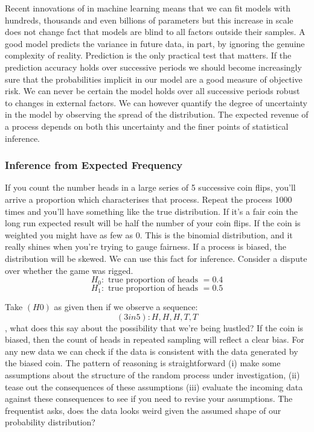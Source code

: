 \documentclass[10pt,a4paper,notitlepage, twocolumn]{article}
\begin{document}
Recent innovations of in machine learning means that we can fit models with hundreds, thousands and even billions of parameters but this increase in scale does not change fact that models are blind to all factors outside their samples. A good model predicts the variance in future data, in part, by ignoring the genuine complexity of reality. Prediction is the only practical test that matters. If the prediction accuracy holds over successive periods we should become increasingly sure that the probabilities implicit in our model are a good measure of objective risk. We can never be certain the model holds over all successive periods robust to changes in external factors. We can however quantify the degree of uncertainty in the model by observing the spread of the distribution. The expected revenue of a process depends on both this uncertainty and the finer points of statistical inference. 

\subsubsection*{Inference from Expected Frequency}
If you count the number heads in a large series of 5 successive coin flips, you'll arrive a proportion which characterises that process. Repeat the process 1000 times and you'll have something like the true distribution. If it's a fair coin the long run expected result will be half the number of your coin flips. If the coin is weighted you might have as few as 0. This is the binomial distribution, and it really shines when you're trying to gauge fairness. If a process is biased, the distribution will be skewed. We can use this fact for inference. Consider a dispute over whether the game was rigged. 
$$ H_0 : \text{ true proportion of heads } = 0.4  $$
$$ H_1 : \text{ true proportion of heads } =  0.5 $$

\noindent Take $(H0)$ as given then if we observe a sequence: $$ (3in5): H, H, H, T, T$$, what does this say about the possibility that we're being hustled? If the coin is biased, then the count of heads in repeated sampling will reflect a clear bias. For any new data we can check if the data is consistent with the data generated by the biased coin. The pattern of reasoning is straightforward (i) make some assumptions about the structure of the random process under investigation, (ii) tease out the consequences of these assumptions (iii) evaluate the incoming data against these consequences to see if you need to revise your assumptions. The frequentist asks, does the data looks weird given the assumed shape of our probability distribution?
\end{document}
